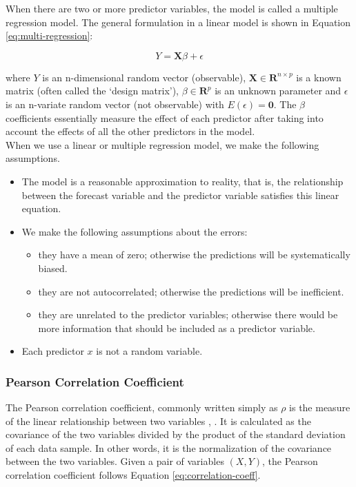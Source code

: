 When there are two or more predictor variables, the model is called a multiple regression model. The general formulation in a linear model is shown in Equation \ref{eq:multi-regression}:

\begin{equation}
    Y = \mathbf{X}\beta + \epsilon
    \label{eq:multi-regression}
\end{equation}

where $Y$ is an n-dimensional random vector (observable), $\mathbf{X} \in \mathbf{R} ^{n \times p}$ is a known matrix (often called the `design matrix'), $\beta \in \mathbf{R}^p$ is an unknown parameter and $\epsilon$ is an n-variate random vector (not observable) with $E(\epsilon) = \mathbf{0}$. The $\beta$ coefficients essentially measure the effect of each predictor after taking into account the effects of all the other predictors in the model. \\

When we use a linear or multiple regression model, we make the following assumptions.

\begin{itemize}
    \item The model is a reasonable approximation to reality, that is, the relationship between the forecast variable and the predictor variable satisfies this linear equation.
    \item We make the following assumptions about the errors:
    \begin{itemize}
        \item they have a mean of zero; otherwise the predictions will be systematically biased.
        \item they are not autocorrelated; otherwise the predictions will be inefficient.
        \item they are unrelated to the predictor variables; otherwise there would be more information that should be included as a predictor variable.
    \end{itemize}
    \item Each predictor $x$ is not a random variable.
\end{itemize}

\subsubsection{Pearson Correlation Coefficient}

The Pearson correlation coefficient, commonly written simply as $\rho$ is the measure of the linear relationship between two variables \cite{correlation-coeff-journal}, \cite{correlation-coeff}. It is calculated as the covariance of the two variables divided by the product of the standard deviation of each data sample. In other words, it is the normalization of the covariance between the two variables. Given a pair of variables $(X, Y)$, the Pearson correlation coefficient follows Equation \ref{eq:correlation-coeff}.

